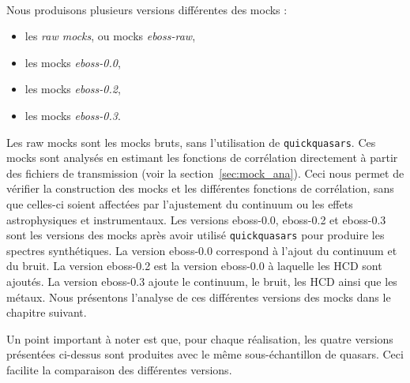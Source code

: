 \paragraph{}
Nous produisons plusieurs versions différentes des mocks :
\begin{itemize}
\item les \emph{raw mocks}, ou mocks \emph{eboss-raw},
\item les mocks \emph{eboss-0.0}, 
\item les mocks \emph{eboss-0.2},
\item les mocks \emph{eboss-0.3}.
\end{itemize}
Les raw mocks sont les mocks bruts, sans l'utilisation de \texttt{quickquasars}. Ces mocks sont analysés en estimant les fonctions de corrélation directement à partir des fichiers de transmission (voir la section~\ref{sec:mock_ana}). Ceci nous permet de vérifier la construction des mocks et les différentes fonctions de corrélation, sans que celles-ci soient affectées par l'ajustement du continuum ou les effets astrophysiques et instrumentaux.
Les versions eboss-0.0, eboss-0.2 et eboss-0.3 sont les versions des mocks après avoir utilisé \texttt{quickquasars} pour produire les spectres synthétiques. La version eboss-0.0 correspond à l'ajout du continuum et du bruit. La version eboss-0.2 est la version eboss-0.0 à laquelle les HCD sont ajoutés. La version eboss-0.3 ajoute le continuum, le bruit, les HCD ainsi que les métaux.
Nous présentons l'analyse de ces différentes versions des mocks dans le chapitre suivant.

Un point important à noter est que, pour chaque réalisation, les quatre versions présentées ci-dessus sont produites avec le même sous-échantillon de quasars. Ceci facilite la comparaison des différentes versions.



% 
